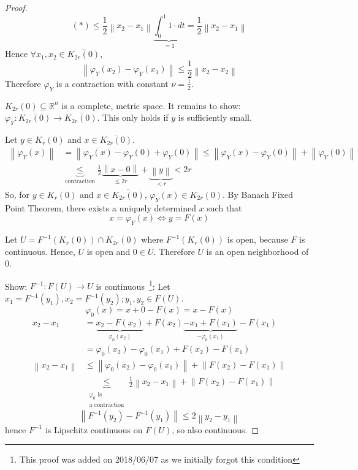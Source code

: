 \documentclass{article}
\newcommand{\norm}[1]{\left\|#1\right\|}
\begin{document}
\begin{proof}
  \[ (*) \leq \frac12 \norm{x_2 - x_1} \underbrace{\int_0^1 1 \cdot dt}_{= 1} = \frac12 \norm{x_2 - x_1} \]
  Hence $\forall x_1, x_2 \in \overline{K_{2r}(0)}$,
  \[ \norm{\varphi_Y(x_2) - \varphi_Y(x_1)} \leq \frac12 \norm{x_2 - x_2} \]
  Therefore $\varphi_Y$ is a contraction with constant $\nu = \frac12$.

  $K_{2r}(0) \subseteq \mathbb R^n$ is a complete, metric space. It remains to show: $\varphi_Y: \overline{K_{2r}(0)} \to \overline{K_{2r}(0)}$.
  This only holds if $y$ is sufficiently small.
  
  Let $y \in K_r(0)$ and $x \in \overline{K_{2r}(0)}$.
  \begin{align*}
    \norm{\varphi_Y(x)} &= \norm{\varphi_Y(x) - \varphi_Y(0) + \varphi_Y(0)} \leq \norm{\varphi_Y(x) - \varphi_Y(0)} + \norm{\varphi_Y(0)} \\
                        &\underbrace{\leq}_{\text{contraction}} \frac12 \underbrace{\norm{x - 0}}_{\leq 2r} + \underbrace{\norm{y}}_{< r} < 2r
  \end{align*}
  So, for $y \in K_r(0)$ and $x \in \overline{K_{2r}(0)}$, $\varphi_Y(x) \in K_{2r}(0)$.
  By Banach Fixed Point Theorem, there exists a uniquely determined $x$ such that
  \[ x = \varphi_Y(x) \iff y = F(x) \]
  
  Let $U = F^{-1}(K_r(0)) \cap K_{2r}(0)$ where $F^{-1}(K_r(0))$ is open, because $F$ is continuous.
  Hence, $U$ is open and $0 \in U$. Therefore $U$ is an open neighborhood of $0$.

  Show: $F^{-1}: F(U) \to U$ is continuous~\footnote{This proof was added on 2018/06/07 as we initially forgot this condition}:
  Let $x_1 = F^{-1}(y_1), x_2 = F^{-1}(y_2); y_1, y_2 \in F(U)$.
  \[ \varphi_0(x) = x + 0 - F(x) = x - F(x) \]
  \begin{align*}
    x_2 - x_1 &= \underbrace{x_2 - F(x_2)}_{\varphi_0(x_2)} + F(x_2) \underbrace{- x_1 + F(x_1)}_{- \varphi_0(x_1)} - F(x_1) \\
      &= \varphi_0(x_2) - \varphi_0(x_1) + F(x_2) - F(x_1) \\
    \norm{x_2 - x_1} &\leq \norm{\varphi_0(x_2) - \varphi_0(x_1)} + \norm{F(x_2) - F(x_1)} \\
      &\underbrace{\leq}_{\substack{\varphi_0 \text{ is} \\ \text{a contraction}}} \frac12 \norm{x_2 - x_1} + \norm{F(x_2) - F(x_1)}
  \end{align*}
  \[ \norm{F^{-1}(y_2) - F^{-1}(y_1)} \leq 2 \norm{y_2 - y_1} \]
  hence $F^{-1}$ is Lipschitz continuous on $F(U)$, so also continuous.
  

\end{proof}
\end{document}
